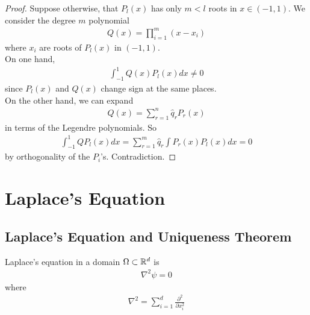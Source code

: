 \documentclass[a4paper]{article}
\begin{document}
\begin{eg}
\begin{proof}
Suppose otherwise, that $P_l\left(x\right)$ has only $m<l$ roots in $x \in \left(-1,1\right)$. We consider the degree $m$ polynomial
\begin{equation*}
\begin{aligned}
Q\left(x\right) = \prod_{i=1}^m \left(x-x_i\right)
\end{aligned}
\end{equation*}
where $x_i$ are roots of $P_l\left(x\right)$ in $\left(-1,1\right)$.\\
On one hand,
\begin{equation*}
\begin{aligned}
\int_{-1}^1 Q\left(x\right) P_l\left(x\right) dx \neq 0
\end{aligned}
\end{equation*}
since $P_l\left(x\right)$ and $Q\left(x\right)$ change sign at the same places.\\
On the other hand, we can expand
\begin{equation*}
\begin{aligned}
Q\left(x\right) = \sum_{r=1}^n \hat{q}_r P_r\left(x\right)
\end{aligned}
\end{equation*}
in terms of the Legendre polynomials. So
\begin{equation*}
\begin{aligned}
\int_{-1}^1 QP_l\left(x\right) dx = \sum_{r=1}^m \hat{q}_r \int P_r\left(x\right) P_l\left(x\right) dx = 0
\end{aligned}
\end{equation*}
by orthogonality of the $P_i$'s. Contradiction.
\end{proof}
\end{eg}

\newpage

\section{Laplace's Equation}

\subsection{Laplace's Equation and Uniqueness Theorem}

Laplace's equation in a domain $\Omega \subset \mathbb{R}^d$ is
\begin{equation*}
\begin{aligned}
\nabla^2 \psi = 0
\end{aligned}
\end{equation*}
where
\begin{equation*}
\begin{aligned}
\nabla^2 = \sum_{i=1}^d \frac{\partial^2}{\partial x_i^2}
\end{aligned}
\end{equation*}
\end{document}
